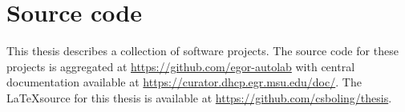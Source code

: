 \section*{Source code}

This thesis describes a collection of software projects. The source
code for these projects is aggregated at
\url{https://github.com/egor-autolab}
with central documentation available at \url{https://curator.dhcp.egr.msu.edu/doc/}.
The \LaTeX source for this thesis is available at \url{https://github.com/csboling/thesis}.


